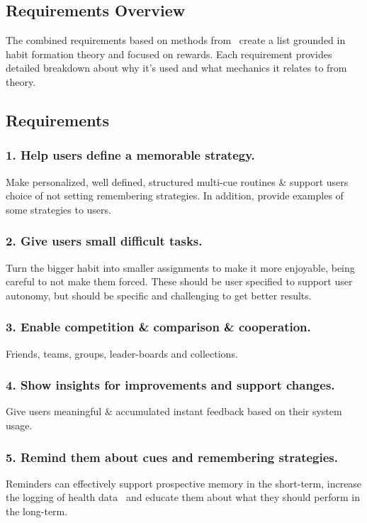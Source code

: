 \subsection{Requirements Overview}

The combined requirements based on methods from~\cite{thesis_kathy, article_taxonomy_motivational_affordances_meaningful} create a list grounded in habit formation theory and focused on rewards. Each requirement provides detailed breakdown about why it's used and what mechanics it relates to from theory.


\subsection{Requirements}
\subsubsection{1. Help users define a memorable strategy.}
Make personalized, well defined, structured multi-cue routines \& support users choice of not setting remembering strategies. In addition, provide examples of some strategies to users.

\subsubsection*{2. Give users small difficult tasks.}
Turn the bigger habit into smaller assignments to make it more enjoyable, being careful to not make them forced. These should be user specified to support user autonomy, but should be specific and challenging to get better results.

\subsubsection*{3. Enable competition \& comparison \& cooperation.}
Friends, teams, groups, leader-boards and collections.

\subsubsection*{4. Show insights for improvements and support changes.}
Give users meaningful \& accumulated  instant feedback based on their system usage.

\subsubsection*{5. Remind them about cues and remembering strategies.}
Reminders can effectively support prospective memory in the short-term, increase the logging of health data~\cite{the_power_of_logging_mobile_notifications} and educate them about what they should perform in the long-term.

